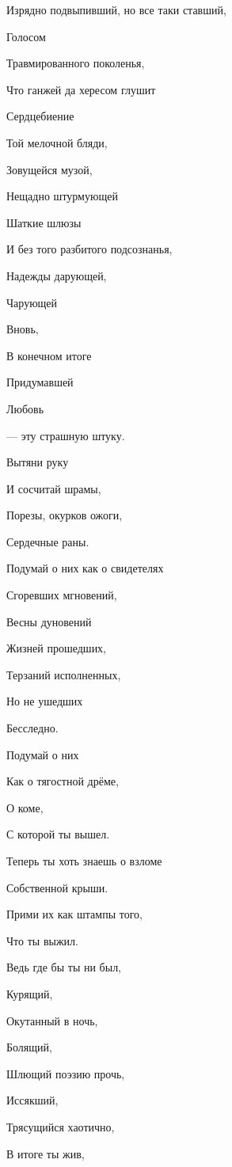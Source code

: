 \documentclass[
  a5paperpaper,
  DIV=11,
  numbers=noendperiod]{scrreprt}
\begin{document}
Изрядно подвыпивший, но все таки ставший,

Голосом

Травмированного поколенья,

Что ганжей да хересом глушит

Сердцебиение

Той мелочной бляди,

Зовущейся музой,

Нещадно штурмующей

Шаткие шлюзы

И без того разбитого подсознанья,

Надежды дарующей,

Чарующей

Вновь,

В конечном итоге

Придумавшей

Любовь

--- эту страшную штуку.

Вытяни руку

И сосчитай шрамы,

Порезы, окурков ожоги,

Сердечные раны.

Подумай о них как о свидетелях

Сгоревших мгновений,

Весны дуновений

Жизней прошедших,

Терзаний исполненных,

Но не ушедших

Бесследно.

Подумай о них

Как о тягостной дрёме,

О коме,

С которой ты вышел.

Теперь ты хоть знаешь о взломе

Собственной крыши.

Прими их как штампы того,

Что ты выжил.

Ведь где бы ты ни был,

Курящий,

Окутанный в ночь,

Болящий,

Шлющий поэзию прочь,

Иссякший,

Трясущийся хаотично,

В итоге ты жив,
\end{document}
